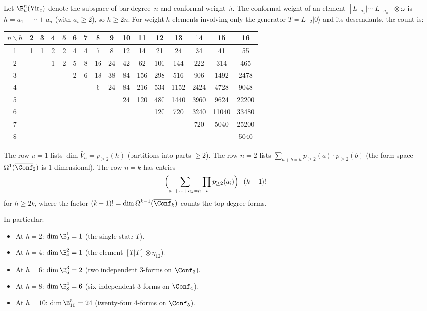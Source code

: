 \begin{computation}
\label{comp:virasoro-dim-table}
Let $\B^n_h(\mathrm{Vir}_c)$ denote the subspace of bar degree~$n$
and conformal weight~$h$.  The conformal weight of an element
$[L_{-a_1}| \cdots |L_{-a_n}] \otimes \omega$ is
$h = a_1 + \cdots + a_n$ (with $a_i \geq 2$), so
$h \geq 2n$.  For weight-$h$ elements involving only the
generator $T = L_{-2}|0\rangle$ and its descendants, the count is:
\begin{center}
\renewcommand{\arraystretch}{1.15}
{\small
\begin{tabular}{c|ccccccccccccccc}
$n \backslash h$ & 2 & 3 & 4 & 5 & 6 & 7 & 8 & 9 & 10 & 11 & 12 & 13 & 14 & 15 & 16 \\
\hline
1 & 1 & 1 & 2 & 2 & 4 & 4 & 7 & 8 & 12 & 14 & 21 & 24 & 34 & 41 & 55 \\
2 & & & 1 & 2 & 5 & 8 & 16 & 24 & 42 & 62 & 100 & 144 & 222 & 314 & 465 \\
3 & & & & & 2 & 6 & 18 & 38 & 84 & 156 & 298 & 516 & 906 & 1492 & 2478 \\
4 & & & & & & & 6 & 24 & 84 & 216 & 534 & 1152 & 2424 & 4728 & 9048 \\
5 & & & & & & & & & 24 & 120 & 480 & 1440 & 3960 & 9624 & 22200 \\
6 & & & & & & & & & & & 120 & 720 & 3240 & 11040 & 33480 \\
7 & & & & & & & & & & & & & 720 & 5040 & 25200 \\
8 & & & & & & & & & & & & & & & 5040
\end{tabular}
}
\end{center}
The row $n = 1$ lists $\dim \bar{V}_h = p_{\geq 2}(h)$
(partitions into parts $\geq 2$).  The row $n = 2$ lists
$\sum_{a+b=h} p_{\geq 2}(a) \cdot p_{\geq 2}(b)$
(the form space $\Omega^1(\overline{\Conf}_2)$ is
$1$-dimensional).
The row $n = k$ has entries
\[
\Bigl(\sum_{a_1 + \cdots + a_k = h}
\prod_i p_{\geq 2}(a_i)\Bigr) \cdot (k-1)!
\]
for $h \geq 2k$, where the factor
$(k-1)! = \dim \Omega^{k-1}(\overline{\Conf}_k)$
counts the top-degree forms.

In particular:
\begin{itemize}
\item At $h = 2$: $\dim \B^1_2 = 1$ (the single state $T$).
\item At $h = 4$: $\dim \B^2_4 = 1$ (the element $[T|T] \otimes \eta_{12}$).
\item At $h = 6$: $\dim \B^3_6 = 2$ (two independent $3$-forms on $\Conf_3$).
\item At $h = 8$: $\dim \B^4_8 = 6$ (six independent $3$-forms on $\Conf_4$).
\item At $h = 10$: $\dim \B^5_{10} = 24$ (twenty-four $4$-forms on $\Conf_5$).
\end{itemize}
\end{computation}

